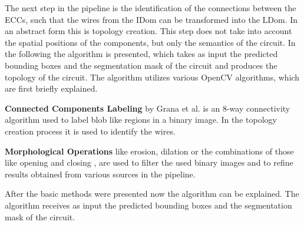 The next step in the pipeline is the identification of the connections between the \acp{ECC}, such that the wires from the \ac{IDom} can be transformed into the \ac{LDom}.
In an abstract form this is topology creation.
This step does not take into account the spatial positions of the components, but only the semantics of the circuit.
In the following the algorithm is presented, which takes as input the predicted bounding boxes and the segmentation mask of the circuit and produces the topology of the circuit.
The algorithm utilizes various OpenCV algorithms, which are first briefly explained.

\textbf{Connected Components Labeling} by Grana et al. \cite{cca} is an 8-way connectivity algorithm used to label blob like regions in a binary image.
In the topology creation process it is used to identify the wires.

\textbf{Morphological Operations} like erosion, dilation or the combinations of those like opening and closing \cite{cv}, are used to filter the used binary images and to refine results obtained from various sources in the pipeline.

After the basic methods were presented now the algorithm can be explained.
The algorithm receives as input the predicted bounding boxes and the segmentation mask of the circuit.

